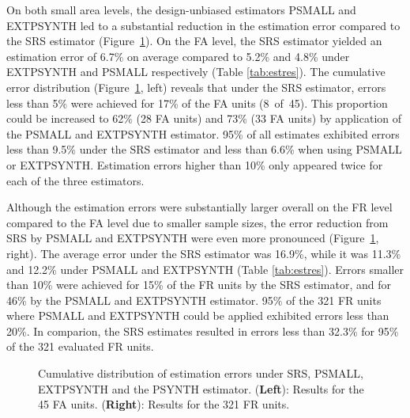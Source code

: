 \documentclass[remotesensing,article,accept,moreauthors,pdftex,10pt,a4paper]{Definitions/mdpi}
\newcommand{\psynth}{PSYNTH}
\newcommand{\psmall}{PSMALL}
\newcommand{\extpsynth}{EXTPSYNTH}
\begin{document}
On both small area levels, the design-unbiased estimators \psmall{} and \extpsynth{} led to a substantial reduction in the estimation error compared to the SRS estimator (Figure~\ref{fig:disterrors}). On the FA level, the SRS estimator yielded an estimation error of 6.7\% on average compared to 5.2\% and 4.8\% under \extpsynth{} and \psmall{} respectively (Table \ref{tab:estres}). The cumulative error distribution (Figure~\ref{fig:disterrors}, left) reveals that under the SRS estimator, errors less than 5\% were achieved for 17\% of the FA units \mbox{(8 of 45}). This proportion could be increased to 62\% (28 FA units) and 73\% (33 FA units) by application of the \psmall{} and \extpsynth{} estimator. 95\% of all estimates exhibited errors less than 9.5\% under the SRS estimator and less than 6.6\% when using \psmall{} or \extpsynth{}. Estimation errors higher than 10\% only appeared twice for each of the three estimators.\par
Although the estimation errors were substantially larger overall on the FR level compared to the FA level due to smaller sample sizes, the error reduction from SRS by \psmall{} and \extpsynth{} were even more pronounced (Figure~\ref{fig:disterrors}, right). The average error under the SRS estimator was 16.9\%, while it was 11.3\% and 12.2\% under \psmall{} and \extpsynth{} (Table \ref{tab:estres}). Errors smaller than 10\% were achieved for 15\% of the FR units by the SRS estimator, and for 46\% by the \psmall{} and \extpsynth{} estimator. 95\% of the 321 FR units where \psmall{} and \extpsynth{} could be applied exhibited errors less than 20\%. In comparion, the SRS estimates resulted in errors less than 32.3\% for 95\% of the 321 evaluated FR units.

\begin{figure}[H]
	\centering
	\caption{Cumulative distribution of estimation errors under SRS, \psmall{}, \extpsynth{} and the \psynth{} estimator. ({\textbf{Left}}): Results for the 45 FA units. ({\textbf{Right}}): Results for the 321 FR units.}
	\label{fig:disterrors}
\end{figure}
\end{document}
